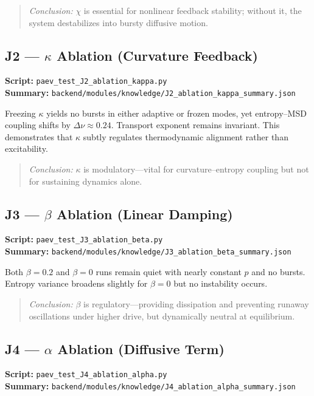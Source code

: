 \documentclass[12pt]{article}
\begin{document}
\begin{quote}
\emph{Conclusion:}
$\chi$ is essential for nonlinear feedback stability; without it, the system destabilizes into bursty diffusive motion.
\end{quote}

\subsection*{J2 — $\kappa$ Ablation (Curvature Feedback)}
\textbf{Script:} \texttt{paev\_test\_J2\_ablation\_kappa.py}\\
\textbf{Summary:} \texttt{backend/modules/knowledge/J2\_ablation\_kappa\_summary.json}

Freezing $\kappa$ yields no bursts in either adaptive or frozen modes, yet entropy–MSD coupling shifts by
$\Delta\nu\approx0.24$.
Transport exponent remains invariant.
This demonstrates that $\kappa$ subtly regulates thermodynamic alignment rather than excitability.

\begin{quote}
\emph{Conclusion:}
$\kappa$ is modulatory—vital for curvature–entropy coupling but not for sustaining dynamics alone.
\end{quote}

\subsection*{J3 — $\beta$ Ablation (Linear Damping)}
\textbf{Script:} \texttt{paev\_test\_J3\_ablation\_beta.py}\\
\textbf{Summary:} \texttt{backend/modules/knowledge/J3\_ablation\_beta\_summary.json}

Both $\beta=0.2$ and $\beta=0$ runs remain quiet with nearly constant \(p\) and no bursts.
Entropy variance broadens slightly for $\beta=0$ but no instability occurs.

\begin{quote}
\emph{Conclusion:}
$\beta$ is regulatory—providing dissipation and preventing runaway oscillations under higher drive, but dynamically neutral at equilibrium.
\end{quote}

\subsection*{J4 — $\alpha$ Ablation (Diffusive Term)}
\textbf{Script:} \texttt{paev\_test\_J4\_ablation\_alpha.py}\\
\textbf{Summary:} \texttt{backend/modules/knowledge/J4\_ablation\_alpha\_summary.json}
\end{document}
